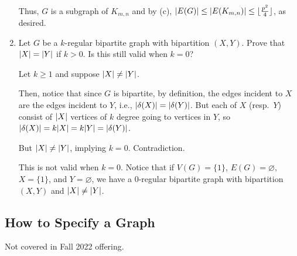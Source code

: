\documentclass[class=math239,notes,tikz]{agony}
\begin{document}
\begin{enumerate}
\begin{sol}
          Thus, $G$ is a subgraph of $K_{m,n}$
          and by (c), $\abs{E(G)} \leq \abs{E(K_{m,n})} \leq \lfloor\frac{p^2}{4}\rfloor$, as desired.
        \end{sol}
  \item Let $G$ be a $k$-regular bipartite graph with bipartition $(X,Y)$.
        Prove that $\abs{X} = \abs{Y}$ if $k > 0$.
        Is this still valid when $k=0$?
        \begin{prf}
          Let $k \geq 1$ and suppose $\abs{X} \neq \abs{Y}$.

          Then, notice that since $G$ is bipartite, by definition,
          the edges incident to $X$ are the edges incident to $Y$,
          i.e., $\abs{\delta(X)} = \abs{\delta(Y)}$.
          But each of $X$ (resp.\ $Y$) consist of $\abs{X}$
          vertices of $k$ degree going to vertices in $Y$,
          so $\abs{\delta(X)} = k\abs{X} = k\abs{Y} = \abs{\delta(Y)}$.

          But $\abs{X} \neq \abs{Y}$, implying $k = 0$. Contradiction.

          This is not valid when $k=0$.
          Notice that if $V(G) = \{1\}$, $E(G) = \varnothing$,
          $X = \{1\}$, and $Y = \varnothing$,
          we have a 0-regular bipartite graph with bipartition $(X,Y)$
          and $\abs{X} \neq \abs{Y}$.
        \end{prf}
\end{enumerate}

\subsection{How to Specify a Graph}

Not covered in Fall 2022 offering.
\end{document}
